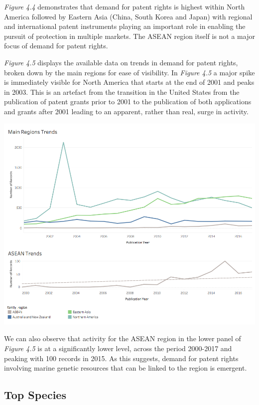 \documentclass[]{book}
\theoremstyle{definition}
\theoremstyle{definition}
\theoremstyle{definition}
\theoremstyle{remark}
\begin{document}
\emph{Figure 4.4} demonstrates that demand for patent rights is highest
within North America followed by Eastern Asia (China, South Korea and
Japan) with regional and international patent instruments playing an
important role in enabling the pursuit of protection in multiple
markets. The ASEAN region itself is not a major focus of demand for
patent rights.

\emph{Figure 4.5} displays the available data on trends in demand for
patent rights, broken down by the main regions for ease of visibility.
In \emph{Figure 4.5} a major spike is immediately visible for North
America that starts at the end of 2001 and peaks in 2003. This is an
artefact from the transition in the United States from the publication
of patent grants prior to 2001 to the publication of both applications
and grants after 2001 leading to an apparent, rather than real, surge in
activity.

\includegraphics[width=13.89in]{images-patents/family_trends_region}

We can also observe that activity for the ASEAN region in the lower
panel of \emph{Figure 4.5} is at a significantly lower level, across the
period 2000-2017 and peaking with 100 records in 2015. As this suggests,
demand for patent rights involving marine genetic resources that can be
linked to the region is emergent.

\hypertarget{top-species}{%
\subsection{Top Species}\label{top-species}}
\end{document}
